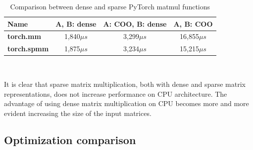 \begin{table}[t]
\centering
    \begin{tabular}{|p{6em} c c c |}
    \hline
    \textbf{Name} & \textbf{A, B: dense} & \textbf{A: COO, B: dense} & \textbf{A, B: COO} \T\B \\
    \hline \hline
    \textbf{torch.mm} & 1,840$\mu s$  & 3,299$\mu s$ & 16,855$\mu s$ \T\B\\
    \hline
    \textbf{torch.spmm} & 1,875$\mu s$  & 3,234$\mu s$ & 15,215$\mu s$ \T\B\\
    \hline
    \end{tabular}
    \\[10pt]
    \caption{Comparison between dense and sparse PyTorch matmul functions}
    \label{tab:torch-matmul-comparison}
\end{table}

It is clear that sparse matrix multiplication, both with dense and sparse matrix representations, does not increase performance on CPU architecture.
The advantage of using dense matrix multiplication on CPU becomes more and more evident increasing the size of the input matrices.

\subsection{Optimization comparison}
\label{subsec:optimization-comparison}%


